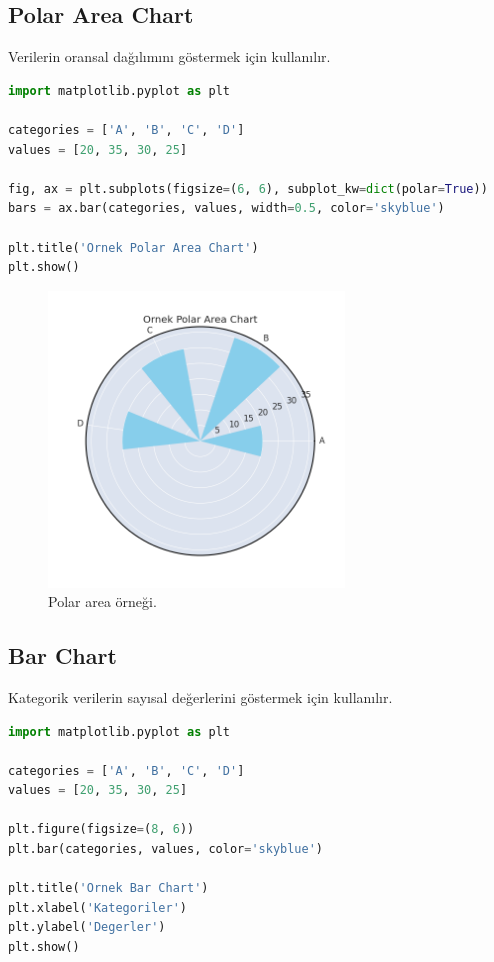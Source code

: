 \newpage

\subsection{Polar Area Chart}
Verilerin oransal dağılımını göstermek için kullanılır.

\begin{lstlisting}[language=Python]
import matplotlib.pyplot as plt

categories = ['A', 'B', 'C', 'D']
values = [20, 35, 30, 25]

fig, ax = plt.subplots(figsize=(6, 6), subplot_kw=dict(polar=True))
bars = ax.bar(categories, values, width=0.5, color='skyblue')

plt.title('Ornek Polar Area Chart')
plt.show()
\end{lstlisting}

\begin{figure}[h]
    \centering
    \includegraphics[width=0.7\textwidth]{images/polar_area_chart.png}
    \caption{Polar area örneği.}
    \label{fig:enter-label}
\end{figure}

\newpage

\subsection{Bar Chart}
Kategorik verilerin sayısal değerlerini göstermek için kullanılır.

\begin{lstlisting}[language=Python]
import matplotlib.pyplot as plt

categories = ['A', 'B', 'C', 'D']
values = [20, 35, 30, 25]

plt.figure(figsize=(8, 6))
plt.bar(categories, values, color='skyblue')

plt.title('Ornek Bar Chart')
plt.xlabel('Kategoriler')
plt.ylabel('Degerler')
plt.show()
\end{lstlisting}

